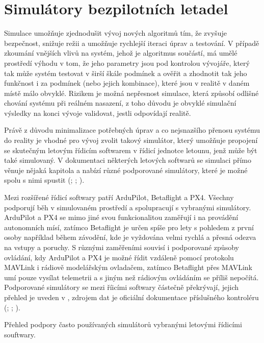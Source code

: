 \chapter{Simulátory bezpilotních letadel}
    Simulace umožňuje zjednodušit vývoj nových algoritmů tím, že zvyšuje bezpečnost, snižuje režii a umožňuje rychlejší iteraci úprav a testování. V případě zkoumání vnějších vlivů na systém, jehož je algoritmus součástí, má umělé prostředí výhodu v tom, že jeho parametry jsou pod kontrolou vývojáře, který tak může systém testovat v širší škále podmínek a ověřit a zhodnotit tak jeho funkčnost i za podmínek (nebo jejich kombinace), které jsou v realitě v daném místě málo obvyklé. Rizikem je možná nepřesnost simulace, která způsobí odlišné chování systému při reálném nasazení, z toho důvodu je obvyklé simulační výsledky na konci vývoje validovat, jestli odpovídají realitě.

    Právě z důvodu minimalizace potřebných úprav a co nejsnazšího přenosu systému do reality je vhodné pro vývoj zvolit takový simulátor, který umožňuje propojení se skutečným letovým řídicím softwarem v řídicí jednotce letounu, jenž může být také simulovaný. V dokumentaci některých letových softwarů se simulaci přímo věnuje nějaká kapitola a nabízí různé podporované simulátory, které je možné spolu s nimi spustit (\cite{px4:simulation}; \cite{ardupilot:simulation}; \cite{betaflight:simulation}).

    Mezi rozšířené řídicí softwary patří ArduPilot, Betaflight a PX4. Všechny podporují běh v simulovaném prostředí a spolupracují s vybranými simulátory. ArduPilot a PX4 se mimo jiné svou funkcionalitou zaměřují i na provádění autonomních mísí, zatímco Betaflight je určen spíše pro lety s pohledem z první osoby například během závodění, kde je vyždována velmi rychlá a přesná odezva na vstupy a poruchy. S různými zaměřeními souvisí i podporované způsoby ovládání, kdy ArduPilot a PX4 je možné řídit vzdáleně pomocí protokolu MAVLink i rádiově modelářským ovladačem, zatímco Betaflight přes MAVLink umí pouze vysílat telemetrii a s jiným než rádiovým ovládáním se příliš nepočítá. Podporované simulátory se mezi říicími softwary částečně překrývají, jejich přehled je uveden v , zdrojem dat je oficiální dokumentace příslušného kontroléru (\cite{px4:simulation}; \cite{ardupilot:simulation}; \cite{betaflight:simulation}).

    \begin{table}
        \centering
        
        \caption[Simulátory podporované kontrolérem letounu]{Přehled podpory často používaných simulátorů vybranými letovými řídicími souftwary.}
        \label{tab:sims}
    \end{table}

